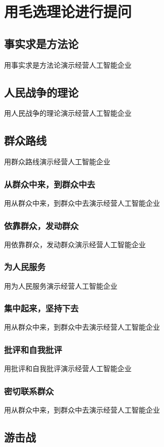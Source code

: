 \documentclass[12pt]{book}
\begin{document}
\chapter{用毛选理论进行提问}
\section{事实求是方法论}
用事实求是方法论演示经营人工智能企业

\section{人民战争的理论}
用人民战争的理论演示经营人工智能企业

\section{群众路线}
用群众路线演示经营人工智能企业

\subsection{从群众中来，到群众中去}
用从群众中来，到群众中去演示经营人工智能企业

\subsection{依靠群众，发动群众}
用依靠群众，发动群众演示经营人工智能企业

\subsection{为人民服务}
用为人民服务演示经营人工智能企业

\subsection{集中起来，坚持下去}
用从群众中来，到群众中去演示经营人工智能企业

\subsection{批评和自我批评}
用批评和自我批评演示经营人工智能企业

\subsection{密切联系群众}
用从群众中来，到群众中去演示经营人工智能企业

\section{游击战}
\end{document}
